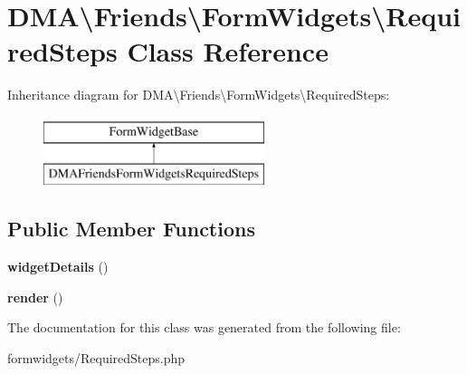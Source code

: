 \hypertarget{classDMA_1_1Friends_1_1FormWidgets_1_1RequiredSteps}{\section{D\+M\+A\textbackslash{}Friends\textbackslash{}Form\+Widgets\textbackslash{}Required\+Steps Class Reference}
\label{classDMA_1_1Friends_1_1FormWidgets_1_1RequiredSteps}
}
Inheritance diagram for D\+M\+A\textbackslash{}Friends\textbackslash{}Form\+Widgets\textbackslash{}Required\+Steps\+:\begin{figure}[H]
\begin{center}
\leavevmode
\includegraphics[height=2.000000cm]{dd/db5/classDMA_1_1Friends_1_1FormWidgets_1_1RequiredSteps}
\end{center}
\end{figure}
\subsection*{Public Member Functions}
\begin{DoxyCompactItemize}
\item 
\hypertarget{classDMA_1_1Friends_1_1FormWidgets_1_1RequiredSteps_a7515c39fb1cd2bf16604b907e98485e2}{{\bfseries widget\+Details} ()}\label{classDMA_1_1Friends_1_1FormWidgets_1_1RequiredSteps_a7515c39fb1cd2bf16604b907e98485e2}

\item 
\hypertarget{classDMA_1_1Friends_1_1FormWidgets_1_1RequiredSteps_ae3ebaf8a7cf65ac562796d7bd3bc4567}{{\bfseries render} ()}\label{classDMA_1_1Friends_1_1FormWidgets_1_1RequiredSteps_ae3ebaf8a7cf65ac562796d7bd3bc4567}

\end{DoxyCompactItemize}


The documentation for this class was generated from the following file\+:\begin{DoxyCompactItemize}
\item 
formwidgets/Required\+Steps.\+php\end{DoxyCompactItemize}
